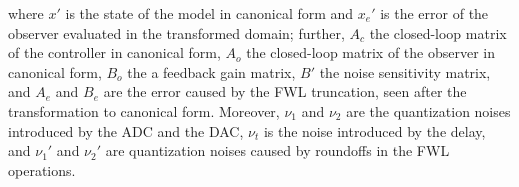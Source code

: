 \documentclass[sigconf]{llncs}
\newcommand{\mat}[1]{{#1}}
\renewcommand{\vec}[1]{{#1}}
\begin{document}
where $\vec{x}'$ is the state of the model in canonical form and $\vec{x}_e'$ is the error of the observer evaluated in the transformed domain; 
further, $\mat{A}_{c}$ the closed-loop matrix of the controller in canonical form, 
$\mat{A}_{o}$ the closed-loop matrix of the observer in canonical form, 
$\mat{B}_{o}$ the a feedback gain matrix, 
 $\mat{B}'$ the noise sensitivity matrix, 
and $\mat{A}_{e}$ and $\mat{B}_{e}$ are the error caused by the FWL truncation, seen after the transformation to canonical form.
Moreover, $\nu_1$ and $\nu_2$ are the quantization noises introduced by the ADC and the DAC, $\nu_t$ is the noise introduced by the delay, and $\nu_1'$ and $\nu_2'$ are quantization noises caused by roundoffs in the FWL operations. 
\end{document}
